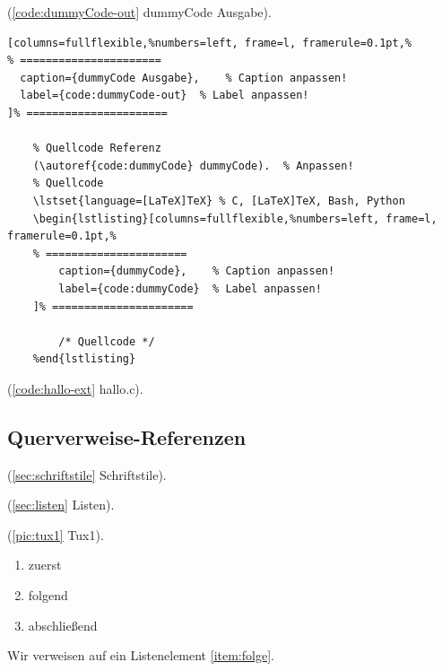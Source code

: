 (\autoref{code:dummyCode-out} dummyCode Ausgabe).  %
\lstset{language=[LaTeX]TeX} %
\begin{lstlisting}[columns=fullflexible,%numbers=left, frame=l, framerule=0.1pt,%
% ======================
  caption={dummyCode Ausgabe},    % Caption anpassen!
  label={code:dummyCode-out}  % Label anpassen!
]% ======================

	% Quellcode Referenz
	(\autoref{code:dummyCode} dummyCode).  % Anpassen!
	% Quellcode
	\lstset{language=[LaTeX]TeX} % C, [LaTeX]TeX, Bash, Python
	\begin{lstlisting}[columns=fullflexible,%numbers=left, frame=l, framerule=0.1pt,%
	% ======================
		caption={dummyCode},    % Caption anpassen!
		label={code:dummyCode}  % Label anpassen!
	]% ======================

		/* Quellcode */
	%end{lstlisting}
\end{lstlisting}

(\autoref{code:hallo-ext} hallo.c).    %
	\lstset{language=C}%

\newpage

\subsection{Querverweise-Referenzen}\label{sec:quer-ref}

(\autoref{sec:schriftstile} Schriftstile).

(\autoref{sec:listen} Listen).

(\autoref{pic:tux1} Tux1).

\begin{enumerate}
	\item zuerst
	\item \label{item:folge} folgend
	\item abschließend
\end{enumerate}

Wir verweisen auf ein Listenelement \autoref{item:folge}.

